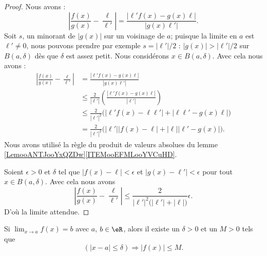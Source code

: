 \begin{proof}
	Nous avons :
	\begin{equation}
		\left| \frac{ f(x) }{ g(x) }-\frac{ \ell }{ \ell' } \right| =\frac{ | \ell'f(x)-g(x)\ell | }{ |g(x)\ell'| }.
	\end{equation}
	Soit \( s\), un minorant de \( | g(x) |\) sur un voisinage de \( a\); puisque la limite en \( a\) est \( \ell'\neq 0\), nous pouvons prendre par exemple \( s=|\ell'|/2\) : \( | g(x) |>|\ell'|/2\) sur \( B(a,\delta)\) dès que \( \delta\) est assez petit. Nous considérons \( x\in B(a,\delta)\). Avec cela nous avons :
	\begin{subequations}
		\begin{align}
			\left| \frac{ f(x) }{ g(x) }-\frac{ \ell }{ \ell' } \right| & =\frac{ | \ell'f(x)-g(x)\ell | }{ |g(x)\ell'| }                                          \\
			                                                            & \leq \frac{ 2 }{ | \ell' |} \left( \frac{ | \ell'f(x)-g(x)\ell | }{ | \ell' | } \right)  \\
			                                                            & \leq \frac{ 2 }{ | \ell' |^2 }\big( | \ell'f(x)-\ell\ell' |+| \ell\ell'-g(x)\ell | \big) \\
			                                                            & =\frac{ 2 }{ | \ell' |^2 }\big( | \ell' | |f(x)-\ell |+| \ell | |\ell'-g(x) | \big).
		\end{align}
	\end{subequations}
	Nous avons utilisé la règle du produit de valeurs absolues du lemme \ref{LemooANTJooYxQZDw}\ref{ITEMooEFMLooYVCuHD}.

	Soient \( \epsilon>0\) et \( \delta\) tel que \( | f(x)-\ell |<\epsilon\) et \( | g(x)-\ell' |<\epsilon\) pour tout \( x\in B(a,\delta)\). Avec cela nous avons
	\begin{equation}
		\left| \frac{ f(x) }{ g(x) }-\frac{ \ell }{ \ell' } \right| \leq\frac{ 2 }{ | \ell' |^2\big( | \ell' |+| \ell | \big) }\epsilon.
	\end{equation}
	D'où la limite attendue.
\end{proof}

\begin{lemma}       \label{LemLimMajorableVois}
	Si \( \lim_{x\to a}f(x)=b\) avec \( a\), \( b\in\eR\), alors il existe un \( \delta>0\) et un \( M>0\) tels que
	\[
		(| x-a |\leq\delta)\Rightarrow | f(x) |\leq M.
	\]
\end{lemma}

